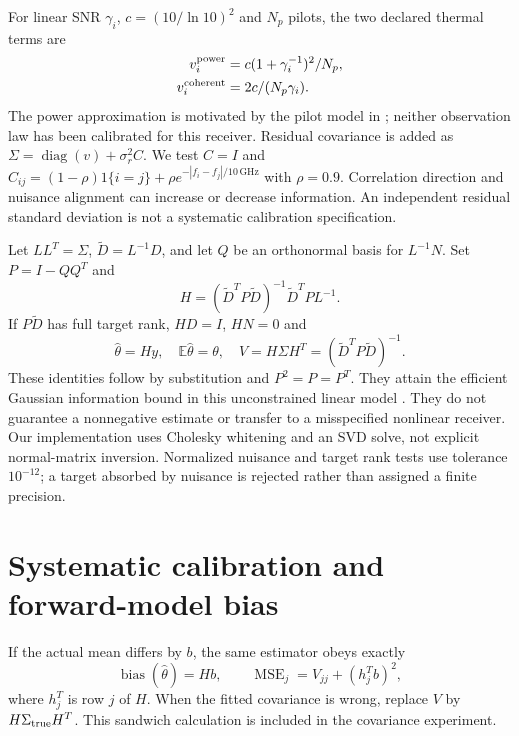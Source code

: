 \documentclass[conference]{IEEEtran}
\begin{document}
For linear SNR $\gamma_i$, $c=(10/\ln10)^2$ and $N_p$ pilots, the two declared thermal terms are
\begin{align}
v_i^{\rm power}&=c(1+\gamma_i^{-1})^2/N_p,\\
v_i^{\rm coherent}&=2c/(N_p\gamma_i).
\end{align}
The power approximation is motivated by the pilot model in \cite{dong2026rain}; neither observation law has been calibrated for this receiver. Residual covariance is added as $\Sigma=\operatorname{diag}(v)+\sigma_r^2 C$. We test $C=I$ and $C_{ij}=(1-\rho)1\{i=j\}+\rho e^{-|f_i-f_j|/10\,\mathrm{GHz}}$ with $\rho=0.9$. Correlation direction and nuisance alignment can increase or decrease information. An independent residual standard deviation is not a systematic calibration specification.

Let $L L^T=\Sigma$, $\widetilde D=L^{-1}D$, and let $Q$ be an orthonormal basis for $L^{-1}N$. Set $P=I-QQ^T$ and
\begin{equation}
H=(\widetilde D^TP\widetilde D)^{-1}\widetilde D^TP L^{-1}.
\label{eq:attainable}
\end{equation}
If $P\widetilde D$ has full target rank, $HD=I$, $HN=0$ and
\begin{equation}
\widehat\theta=Hy,\quad \mathbb E\widehat\theta=\theta,\quad
V=H\Sigma H^T=(\widetilde D^TP\widetilde D)^{-1}.
\end{equation}
These identities follow by substitution and $P^2=P=P^T$. They attain the efficient Gaussian information bound in this unconstrained linear model \cite{kay1993}. They do not guarantee a nonnegative estimate or transfer to a misspecified nonlinear receiver. Our implementation uses Cholesky whitening and an SVD solve, not explicit normal-matrix inversion. Normalized nuisance and target rank tests use tolerance $10^{-12}$; a target absorbed by nuisance is rejected rather than assigned a finite precision.

\section{Systematic calibration and forward-model bias}
If the actual mean differs by $b$, the same estimator obeys exactly
\begin{equation}
\operatorname{bias}(\widehat\theta)=Hb,\qquad
\operatorname{MSE}_j=V_{jj}+(h_j^Tb)^2,
\label{eq:bias}
\end{equation}
where $h_j^T$ is row $j$ of $H$. When the fitted covariance is wrong, replace $V$ by $H\Sigma_{\rm true}H^T$. This sandwich calculation is included in the covariance experiment.
\end{document}
